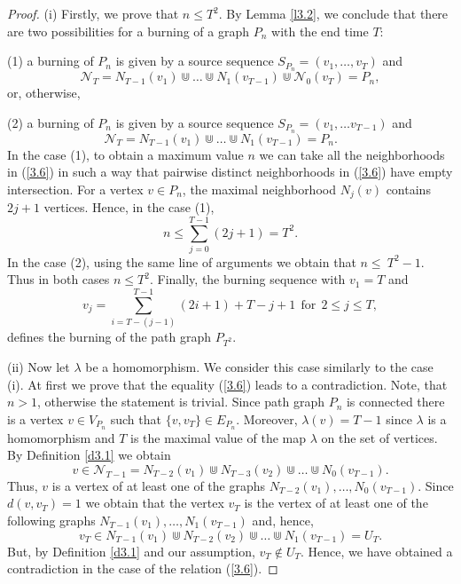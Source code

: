 \documentclass[10pt,a4paper]{amsart}
\begin{document}
\begin{proof}
(i) Firstly, we prove that  $n\le T^2$. By  Lemma \ref{l3.2}, we conclude 
that there are two possibilities for a burning  of a graph $P_n$ with  the end time $T$:

(1) a  burning of $P_n$ is given by a source sequence $S_{P_n}=(v_1,\dots, v_T)$ and 
\begin{equation}\label{3.6}
 \mathcal N_T= N_{T-1}(v_1)\Cup \dots \Cup N_{1}(v_{T-1})\Cup \mathcal N_0(v_T)=P_n,
\end{equation}
or, otherwise,  

(2)  a burning of $P_n$ is given by a source sequence $S_{P_n}=(v_1,\dots v_{T-1})$ and 
\begin{equation}\label{3.7}
 \ \mathcal N_{T}=N_{T-1}(v_1)\Cup  \dots \Cup N_{1}(v_{T-1})=P_n. \ \ \ \ \ \ \ \ 
\end{equation}
In the case (1), to obtain a maximum value $n$ we can take all the neighborhoods  in (\ref{3.6}) in such a way that pairwise distinct  neighborhoods in (\ref{3.6}) have empty intersection.  For a vertex  $v\in P_n$,  the maximal neighborhood 
$N_j(v)$  contains $2j+1$ vertices.  Hence, in the case (1),
\begin{equation}\label{3.8}
n\le \sum_{j=0}^{T-1}(2j+1)=T^2.
\end{equation}
In the case (2), using the same line of arguments   we obtain  that $n\le~T^2-1$.  Thus in both cases  $n\le T^2$. Finally, the burning sequence with $v_1=T$ and 
$$
v_j=\sum_{i=T-(j-1)}^{T-1}(2 i+1)+T-j+1 \ \ \text{for} \ \ 2\le j \le T,
$$
 defines the burning of the path graph  $P_{T^2}$.

(ii)   Now let $\lambda$ be a homomorphism. We consider this case similarly to the case (i).  At first we prove that the  equality (\ref{3.6}) leads to a contradiction. Note, that $n>1$, otherwise the statement is trivial. Since path graph $P_n$ is connected there is a vertex $v\in V_{P_n}$ such that $\{v, v_T\} \in E_{P_n}$. Moreover, $\lambda(v)=T-1$ since $\lambda$ is a homomorphism and $T$ is the maximal value of the map $\lambda$ on the set of vertices.  By Definition \ref{d3.1} we obtain
\begin{equation*}
v\in \mathcal N_{T-1}=N_{T-2}(v_1)\Cup N_{T-3}(v_2)\Cup \dots \Cup N_0(v_{T-1}). 
\end{equation*}
Thus, $v$ is a vertex of at least one of the graphs 
$N_{T-2}(v_1), \dots , N_0(v_{T-1})$.
  Since $d(v,v_T)=1$ we obtain that the vertex $v_T$ 
is the vertex of at least one of  the following  graphs 
$
N_{T-1}(v_1), \dots , N_1(v_{T-1})
$
and, hence, 
\begin{equation*}
v_T\in N_{T-1}(v_1)\Cup  N_{T-2}(v_2) \Cup \dots \Cup N_1(v_{T-1})= U_{T}. 
\end{equation*}
But, by Definition \ref{d3.1} and our assumption, $v_T\notin U_T$. Hence, we have obtained a contradiction in the case of the relation  (\ref{3.6}). 



\end{proof}
\end{document}
